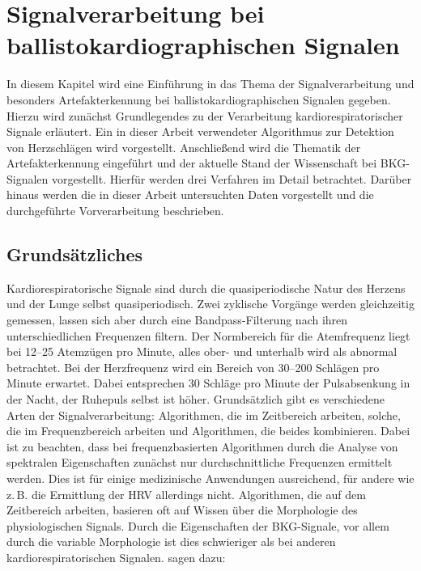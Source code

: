 \chapter{Signalverarbeitung bei ballistokardiographischen Signalen}\label{signalverarbeitung}

In diesem Kapitel wird eine Einführung in das Thema der Signalverarbeitung und besonders Artefakterkennung bei ballistokardiographischen Signalen gegeben. Hierzu wird zunächst Grundlegendes zu der Verarbeitung kardiorespiratorischer Signale erläutert. Ein in dieser Arbeit verwendeter Algorithmus zur Detektion von Herzschlägen wird vorgestellt. Anschließend wird die Thematik der Artefakterkennung eingeführt und der aktuelle Stand der Wissenschaft bei \ac{BKG}-Signalen vorgestellt. Hierfür werden drei Verfahren im Detail betrachtet. Darüber hinaus werden die in dieser Arbeit untersuchten Daten vorgestellt und die durchgeführte Vorverarbeitung beschrieben.

\section{Grundsätzliches}

	Kardiorespiratorische Signale sind durch die quasiperiodische Natur des Herzens und der Lunge selbst quasiperiodisch. Zwei zyklische Vorgänge werden gleichzeitig gemessen, lassen sich aber durch eine Bandpass-Filterung nach ihren unterschiedlichen Frequenzen filtern. Der Normbereich für die Atemfrequenz liegt bei \numrange{12}{25} Atemzügen pro Minute, alles ober- und unterhalb wird als abnormal betrachtet. Bei der Herzfrequenz wird ein Bereich von \numrange{30}{200} Schlägen pro Minute erwartet. Dabei entsprechen 30 Schläge pro Minute der Pulsabsenkung in der Nacht, der Ruhepuls selbst ist höher. Grundsätzlich gibt es verschiedene Arten der Signalverarbeitung: Algorithmen, die im Zeitbereich arbeiten, solche, die im Frequenzbereich arbeiten und Algorithmen, die beides kombinieren. Dabei ist zu beachten, dass bei frequenzbasierten Algorithmen durch die Analyse von spektralen Eigenschaften zunächst nur durchschnittliche Frequenzen ermittelt werden. Dies ist für einige medizinische Anwendungen ausreichend, für andere wie z.\,B. die Ermittlung der \ac{HRV} allerdings nicht. Algorithmen, die auf dem Zeitbereich arbeiten, basieren oft auf Wissen über die Morphologie des physiologischen Signals. Durch die Eigenschaften der \ac{BKG}-Signale, vor allem durch die variable Morphologie ist dies schwieriger als bei anderen kardiorespiratorischen Signalen. %
	\citeauthor{Paalasmaa2015} sagen dazu:

